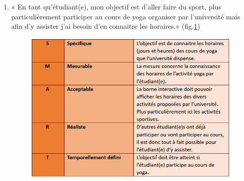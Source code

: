\begin{enumerate}
\begin{figure} [H]
    \end{figure}
    \item « En tant qu’étudiant(e), mon objectif est d’aller faire du sport, plus particulièrement participer au cours de yoga organiser par l’université mais afin d’y assister j’ai besoin d’en connaitre les horaires.» (fig.\ref{smart4})
    \begin{figure} [h]
        \label{smart4} \caption{}
        \centering
        \includegraphics[width=13cm]{Pictures/smart4.png}
    \end{figure}
\end{enumerate}



